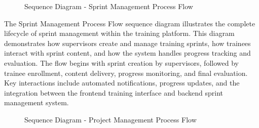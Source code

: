 \begin{figure}[H]
    \centering
    \caption{Sequence Diagram - Sprint Management Process Flow}
    \label{fig:sequence_diagram_sprint}
\end{figure}

\noindent
The Sprint Management Process Flow sequence diagram illustrates the complete lifecycle of sprint management within the training platform. This diagram demonstrates how supervisors create and manage training sprints, how trainees interact with sprint content, and how the system handles progress tracking and evaluation. The flow begins with sprint creation by supervisors, followed by trainee enrollment, content delivery, progress monitoring, and final evaluation. Key interactions include automated notifications, progress updates, and the integration between the frontend training interface and backend sprint management system.

\begin{figure}[H]
    \centering
    \caption{Sequence Diagram - Project Management Process Flow}
    \label{fig:sequence_diagram_project}
\end{figure}

